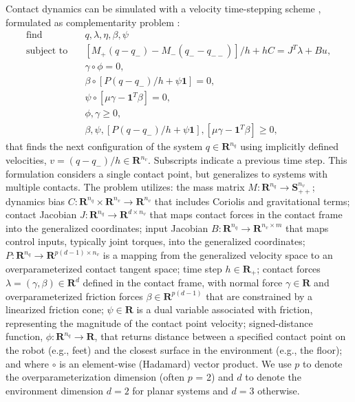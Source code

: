 Contact dynamics can be simulated with a velocity time-stepping scheme \cite{stewart1996implicit}, formulated as complementarity problem \cite{cottle2009linear}: 
\begin{align}
	\label{cipc_feas_prob}
	{\mbox{find}} \quad & q, \lambda,\eta, \beta, \psi \\
	\mbox{subject to} \quad & \left[M_{+}(q - q_{-}) - M_{-}(q_{-} - q_{--})\right] / h + h C =  J^T \lambda + B u, \label{cipc_smooth_dynamics}\\
	& \gamma \circ \phi = 0, \label{cipc_impact_complementarity}\\
	& \beta \circ \left[ P (q - q_{-})/h + \psi \textbf{1} \right] = 0, \label{cipc_friction_complementarity} \\
	& \psi \circ \left[\mu \gamma - \textbf{1}^T \beta \right] = 0, \label{cipc_friction_velocity_complementarity}\\
	& \phi, \gamma \geq 0, \label{cipc_impact_inequalities} \\
	& \beta, \psi, [P (q - q_{-})/h + \psi \textbf{1}], [\mu \gamma - \textbf{1}^T \beta] \geq 0, \label{cipc_friction_inequalities}
\end{align}
that finds the next configuration of the system $q \in \mathbf{R}^{n_q}$ using implicitly defined velocities, $v = (q - q_{-}) / h \in \mathbf{R}^{n_v}$. Subscripts indicate a previous time step. This formulation considers a single contact point, but generalizes to systems with multiple contacts.
The problem utilizes: the mass matrix $M: \mathbf{R}^{n_q} \rightarrow \mathbf{S}_{++}^{n_v}$; dynamics bias $C: \mathbf{R}^{n_q} \times \mathbf{R}^{n_v} \rightarrow \mathbf{R}^{n_v}$ that includes Coriolis and gravitational terms; contact Jacobian $J: \mathbf{R}^{n_q} \rightarrow \mathbf{R}^{d \times n_v}$ that maps contact forces in the contact frame into the generalized coordinates; input Jacobian $B: \mathbf{R}^{n_q} \rightarrow \mathbf{R}^{n_v \times m}$ that maps control inputs, typically joint torques, into the generalized coordinates; $P: \mathbf{R}^{n_q} \rightarrow \mathbf{R}^{p (d-1) \times n_v}$ is a mapping from the generalized velocity space to an overparameterized contact tangent space; time step $h \in \mathbf{R}_{+}$; contact forces $\lambda = (\gamma, \beta) \in \mathbf{R}^d$ defined in the contact frame, with normal force $\gamma \in \mathbf{R}$ and overparameterized friction forces $\beta \in \mathbf{R}^{p (d - 1)}$ that are constrained by a linearized friction cone; $\psi \in \mathbf{R}$ is a dual variable associated with friction, representing the magnitude of the contact point velocity; signed-distance function, $\phi: \mathbf{R}^{n_q} \rightarrow \mathbf{R}$, that returns distance between a specified contact point on the robot (e.g., feet) and the closest surface in the environment (e.g., the floor); and where $\circ$ is an element-wise (Hadamard) vector product. We use $p$ to denote the overparameterization dimension (often $p$ = 2) and $d$ to denote the environment dimension $d = 2$ for planar systems and $d = 3$ otherwise.

